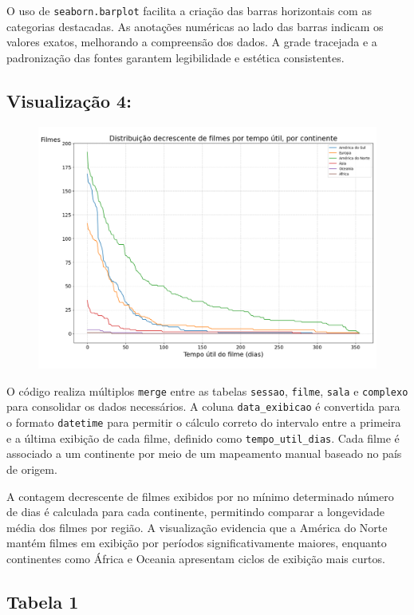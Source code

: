 \documentclass{article}
\begin{document}
O uso de \texttt{seaborn.barplot} facilita a criação das barras horizontais com as categorias destacadas. As anotações numéricas ao lado das barras indicam os valores exatos, melhorando a compreensão dos dados. A grade tracejada e a padronização das fontes garantem legibilidade e estética consistentes.


\subsection*{Visualização 4:}
\begin{figure}[H]
    \centerline{\includegraphics[width = \linewidth]{img/Figure_4.png}}
\end{figure}

O código realiza múltiplos \texttt{merge} entre as tabelas \texttt{sessao}, \texttt{filme}, \texttt{sala} e \texttt{complexo} para consolidar os dados necessários. A coluna \texttt{data\_exibicao} é convertida para o formato \texttt{datetime} para permitir o cálculo correto do intervalo entre a primeira e a última exibição de cada filme, definido como \texttt{tempo\_util\_dias}. Cada filme é associado a um continente por meio de um mapeamento manual baseado no país de origem.

A contagem decrescente de filmes exibidos por no mínimo determinado número de dias é calculada para cada continente, permitindo comparar a longevidade média dos filmes por região. A visualização evidencia que a América do Norte mantém filmes em exibição por períodos significativamente maiores, enquanto continentes como África e Oceania apresentam ciclos de exibição mais curtos.


\subsection*{Tabela 1}
\end{document}
